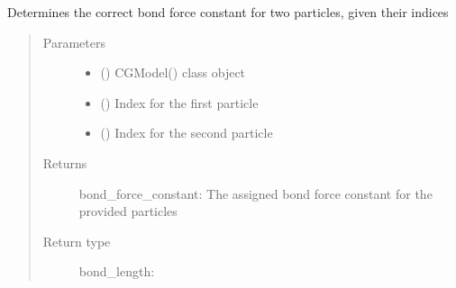 \documentclass[letterpaper,12pt,english,openany,oneside]{sphinxmanual}
\begin{document}
\begin{fulllineitems}
\begin{fulllineitems}
\label{\detokenize{cg_model:cg_model.cgmodel.CGModel.get_bond_force_constant}}
Determines the correct bond force constant for two particles, given their indices
\begin{quote}\begin{description}
\item[{Parameters}] \leavevmode\begin{itemize}
\item {} 
 () \textendash{} CGModel() class object

\item {} 
 () \textendash{} Index for the first particle

\item {} 
 () \textendash{} Index for the second particle

\end{itemize}

\item[{Returns}] \leavevmode
bond\_force\_constant: The assigned bond force constant for the provided particles

\item[{Return type}] \leavevmode

bond\_length: 


\end{description}\end{quote}

\end{fulllineitems}



\end{fulllineitems}
\end{document}
